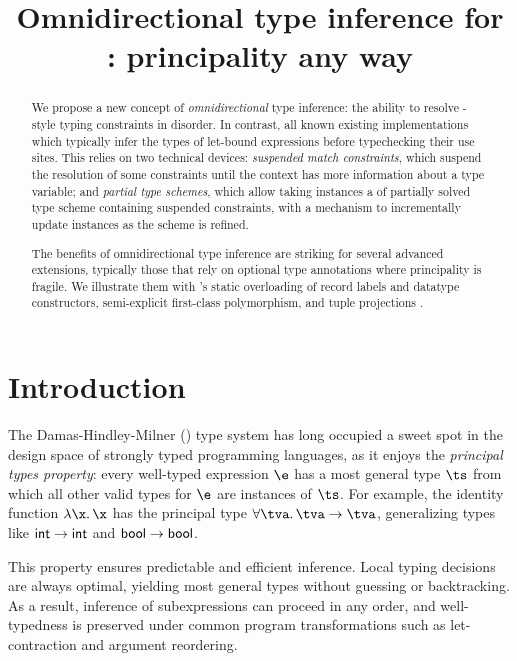 \documentclass[acmsmall,screen,nonacm,review]{acmart}
\title{Omnidirectional type inference for \ML: principality any way}
\begin{document}
\begin{abstract}

We propose a new concept of \emph{omnidirectional} type inference: the
ability to resolve \ML-style typing constraints in disorder. In contrast,
all known existing implementations which typically infer the types of
let-bound expressions before typechecking their use sites.
%
This relies on two technical devices: \emph{suspended match constraints}, which
suspend the resolution of some constraints until the context has more
information about a type variable; and \emph{partial type schemes}, which allow
taking instances a of partially solved type scheme containing suspended
constraints, with a
mechanism to incrementally update instances as the scheme is refined.

The benefits of omnidirectional type inference are striking for several
advanced \ML extensions, typically those that rely on optional type
annotations where principality is fragile. We illustrate them with \OCaml's
static overloading of record labels and datatype constructors, semi-explicit
first-class polymorphism, and tuple projections \ala \SML.
\end{abstract}
\maketitle

\section{Introduction}
\label{sec/introduction}


The Damas-Hindley-Milner (\HM) \citep*{Damas-Milner/W@popl82} type system has
long occupied a sweet spot in the design space of strongly typed programming
languages, as it enjoys the \emph{principal types property}: every well-typed
expression $\e$ has a most general type $\ts$ from which all other valid
types for $\e$ are instances of $\ts$. For example, the identity function
$\efun \x \x$ has the principal type $\tfor \tv \tv \to \tv$, generalizing
types like $\mathsf{int} \to \mathsf{int}$ and $\mathsf{bool} \to \mathsf{bool}$.


This property ensures predictable and efficient inference. Local typing
decisions are always optimal, yielding most general types without guessing or
backtracking. As a result, inference of subexpressions can proceed in any
order, and well-typedness is preserved under common program transformations
such as let-contraction and argument reordering.
\end{document}
